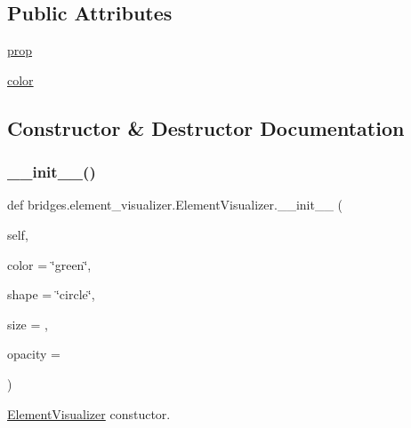 \subsection*{Public Attributes}
\begin{DoxyCompactItemize}
\item 
\mbox{\hyperlink{classbridges_1_1element__visualizer_1_1_element_visualizer_ac60ae1b3b3668b03dc4017e0ba4a199b}{prop}}
\item 
\mbox{\hyperlink{classbridges_1_1element__visualizer_1_1_element_visualizer_a1fd985698e1c56289ed49fa7849d43ab}{color}}
\end{DoxyCompactItemize}


\subsection{Constructor \& Destructor Documentation}
\mbox{\label{classbridges_1_1element__visualizer_1_1_element_visualizer_a27ee5eddf78bac93e2702b2f2203518a}} 
\subsubsection{\texorpdfstring{\+\_\+\+\_\+init\+\_\+\+\_\+()}{\_\_init\_\_()}}
{\footnotesize\ttfamily def bridges.\+element\+\_\+visualizer.\+Element\+Visualizer.\+\_\+\+\_\+init\+\_\+\+\_\+ (\begin{DoxyParamCaption}\item[{}]{self,  }\item[{}]{color = {\ttfamily \char`\"{}green\char`\"{}},  }\item[{}]{shape = {\ttfamily \char`\"{}circle\char`\"{}},  }\item[{}]{size = {},  }\item[{}]{opacity = {} }\end{DoxyParamCaption})}



\mbox{\hyperlink{classbridges_1_1element__visualizer_1_1_element_visualizer}{Element\+Visualizer}} constuctor. 

